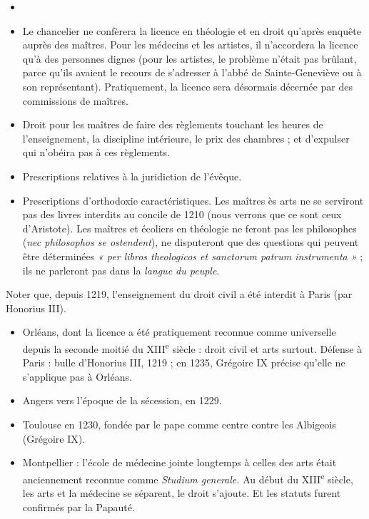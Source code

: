 \documentclass[french,twoside]{book} %
\begin{document}
\begin{itemize}[itemsep=0pt,]
\item[] \hspace{-1.5em}{\bfseries Les clauses essentielles sont les suivantes :}
\item Le chancelier ne confèrera la licence en théologie et en droit qu’après enquête auprès des maîtres. Pour les médecins et les artistes, il n’accordera la licence qu’à des personnes dignes (pour les artistes, le problème n’était pas brûlant, parce qu’ils avaient le recours de s’adresser à l’abbé de Sainte-Geneviève ou à son représentant). Pratiquement, la licence sera désormais décernée par des commissions de maîtres.
\item Droit pour les maîtres de faire des règlements touchant les heures de l’enseignement, la discipline intérieure, le prix des chambres ; et d’expulser qui n’obéira pas à ces règlements.
\item Prescriptions relatives à la juridiction de l’évêque.
\item Prescriptions d’orthodoxie caractéristiques. Les maîtres ès arts ne se serviront pas des livres interdits au concile de 1210 (nous verrons que ce sont ceux d’Aristote). Les maîtres et écoliers en théologie ne feront pas les philosophes ({\itshape nec philosophos se ostendent}), ne disputeront que des questions qui peuvent être déterminées \emph{« per libros theologicos et sanctorum patrum instrumenta »} ; ils ne parleront pas dans la \emph{langue du peuple}.
\end{itemize}
\noindent Noter que, depuis 1219, l’enseignement du droit civil a été interdit à Paris (par Honorius III).\par

\begin{itemize}[itemsep=0pt,]
\item Orléans, dont la licence a été pratiquement reconnue comme universelle depuis la seconde moitié du XIII\textsuperscript{e} siècle : droit civil et  
\label{p117} arts surtout. Défense à Paris : bulle d’Honorius III, 1219 ; en 1235, Grégoire IX précise qu’elle ne s’applique pas à Orléans.
\item Angers vers l’époque de la sécession, en 1229.
\item Toulouse en 1230, fondée par le pape comme centre contre les Albigeois (Grégoire IX).
\item Montpellier : l’école de médecine jointe longtemps à celles des arts était anciennement reconnue comme {\itshape Studium generale.} Au début du XIII\textsuperscript{e} siècle, les arts et la médecine se séparent, le droit s’ajoute. Et les statuts furent confirmés par la Papauté.
\end{itemize}
\end{document}
